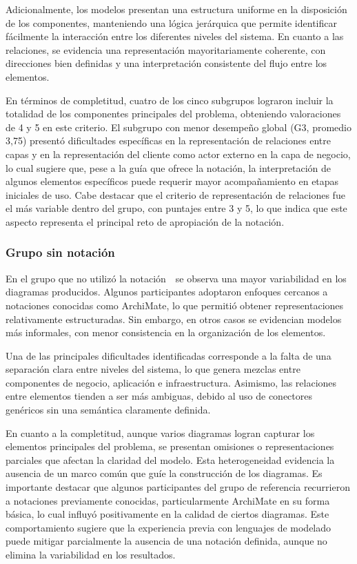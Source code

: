 Adicionalmente, los modelos presentan una estructura uniforme en la disposición de los componentes, manteniendo una lógica jerárquica que permite identificar fácilmente la interacción entre los diferentes niveles del sistema. En cuanto a las relaciones, se evidencia una representación mayoritariamente coherente, con direcciones bien definidas y una interpretación consistente del flujo entre los elementos.

En términos de completitud, cuatro de los cinco subgrupos lograron incluir la totalidad de los componentes principales del problema, obteniendo valoraciones de 4 y 5 en este criterio. El subgrupo con menor desempeño global (G3, promedio 3,75) presentó dificultades específicas en la representación de relaciones entre capas y en la representación del cliente como actor externo en la capa de negocio, lo cual sugiere que, pese a la guía que ofrece la notación, la interpretación de algunos elementos específicos puede requerir mayor acompañamiento en etapas iniciales de uso. Cabe destacar que el criterio de representación de relaciones fue el más variable dentro del grupo, con puntajes entre 3 y 5, lo que indica que este aspecto representa el principal reto de apropiación de la notación.

\subsubsection{Grupo sin notación}
\noindent
En el grupo que no utilizó la notación~\NDITI~se observa una mayor variabilidad en los diagramas producidos. Algunos participantes adoptaron enfoques cercanos a notaciones conocidas como ArchiMate, lo que permitió obtener representaciones relativamente estructuradas. Sin embargo, en otros casos se evidencian modelos más informales, con menor consistencia en la organización de los elementos.

Una de las principales dificultades identificadas corresponde a la falta de una separación clara entre niveles del sistema, lo que genera mezclas entre componentes de negocio, aplicación e infraestructura. Asimismo, las relaciones entre elementos tienden a ser más ambiguas, debido al uso de conectores genéricos sin una semántica claramente definida.

En cuanto a la completitud, aunque varios diagramas logran capturar los elementos principales del problema, se presentan omisiones o representaciones parciales que afectan la claridad del modelo. Esta heterogeneidad evidencia la ausencia de un marco común que guíe la construcción de los diagramas.
\noindent
Es importante destacar que algunos participantes del grupo de referencia recurrieron a notaciones previamente conocidas, particularmente ArchiMate en su forma básica, lo cual influyó positivamente en la calidad de ciertos diagramas. Este comportamiento sugiere que la experiencia previa con lenguajes de modelado puede mitigar parcialmente la ausencia de una notación definida, aunque no elimina la variabilidad en los resultados.

